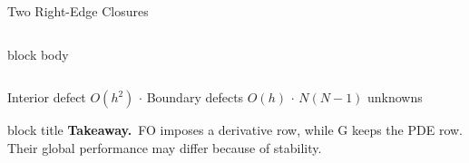 \documentclass[aspectratio=43]{beamer}
\newcommand{\takeaway}[1]{\par\vfill%
  \begin{beamercolorbox}[wd=\linewidth,rounded=true,sep=4pt]{block title}%
  \small\textbf{Takeaway.}\ #1%
  \end{beamercolorbox}\vskip1pt}
\begin{document}
\begin{frame}{Two Right-Edge Closures}
\begin{columns}[T,onlytextwidth]
\begin{beamercolorbox}[wd=\linewidth,rounded=true,sep=4pt]{block body}
\begin{minipage}[t][3.85cm][t]{\linewidth}
\end{minipage}
\end{beamercolorbox}

\end{columns}

\vspace{0.15cm}

\begin{center}
{\scriptsize\color{rgrey}
Interior defect \(O(h^2)\)
\quad $\cdot$ \quad
Boundary defects \(O(h)\)
\quad $\cdot$ \quad
\(N(N-1)\) unknowns
}
\end{center}

\takeaway{FO imposes a derivative row, while G keeps the PDE row. Their global performance may differ because of stability.}

\end{frame}
\end{document}
